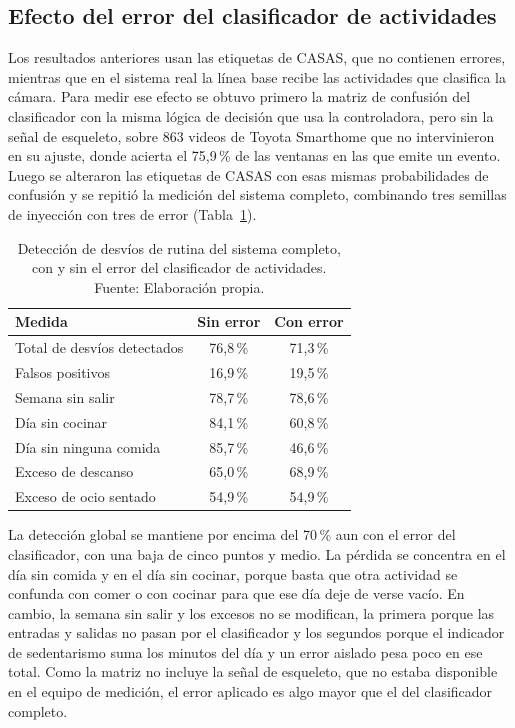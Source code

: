 \subsection{Efecto del error del clasificador de actividades}
\label{sec:pruebas_ruido}

Los resultados anteriores usan las etiquetas de CASAS, que no contienen errores, mientras que en el sistema real la línea base recibe las actividades que clasifica la cámara.
Para medir ese efecto se obtuvo primero la matriz de confusión del clasificador con la misma lógica de decisión que usa la controladora, pero sin la señal de esqueleto, sobre 863 videos de Toyota Smarthome que no intervinieron en su ajuste, donde acierta el 75,9\,\% de las ventanas en las que emite un evento.
Luego se alteraron las etiquetas de CASAS con esas mismas probabilidades de confusión y se repitió la medición del sistema completo, combinando tres semillas de inyección con tres de error (Tabla~\ref{tab:baseline_ruido}).

\begin{table}[H]
\centering
\caption[Detección de desvíos con y sin el error del clasificador.]{Detección de desvíos de rutina del sistema completo, con y sin el error del clasificador de actividades. Fuente: Elaboración propia.}
\label{tab:baseline_ruido}
\small
\begin{tabular}{@{}lcc@{}}
\toprule
\textbf{Medida} & \textbf{Sin error} & \textbf{Con error} \\
\midrule
Total de desvíos detectados & 76,8\,\% & 71,3\,\% \\
Falsos positivos & 16,9\,\% & 19,5\,\% \\
Semana sin salir & 78,7\,\% & 78,6\,\% \\
Día sin cocinar & 84,1\,\% & 60,8\,\% \\
Día sin ninguna comida & 85,7\,\% & 46,6\,\% \\
Exceso de descanso & 65,0\,\% & 68,9\,\% \\
Exceso de ocio sentado & 54,9\,\% & 54,9\,\% \\
\bottomrule
\end{tabular}
\end{table}

La detección global se mantiene por encima del 70\,\% aun con el error del clasificador, con una baja de cinco puntos y medio.
La pérdida se concentra en el día sin comida y en el día sin cocinar, porque basta que otra actividad se confunda con comer o con cocinar para que ese día deje de verse vacío.
En cambio, la semana sin salir y los excesos no se modifican, la primera porque las entradas y salidas no pasan por el clasificador y los segundos porque el indicador de sedentarismo suma los minutos del día y un error aislado pesa poco en ese total.
Como la matriz no incluye la señal de esqueleto, que no estaba disponible en el equipo de medición, el error aplicado es algo mayor que el del clasificador completo.

